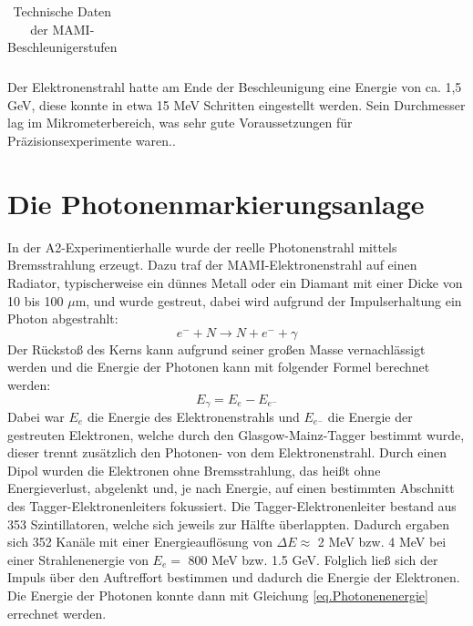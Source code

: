 \documentclass[a4paper,11pt,oneside,final,german,openbib,pdftex]{scrbook}
\begin{document}
{\begin{table}[h]
\begin{center}
\begin{tabular}{|l|c|c|c|c|}
	
		\end{tabular}
		\caption{Technische Daten der MAMI-Beschleunigerstufen \cite{Un08}}
		\label{tab.MAMIstufen}
	\end{center}
\end{table}


 Der Elektronenstrahl hatte am Ende der Beschleunigung eine Energie von ca. 1,5 GeV, diese konnte in etwa 15 MeV Schritten eingestellt werden. Sein Durchmesser lag im Mikrometerbereich, was sehr gute Voraussetzungen f\"ur Pr\"azisionsexperimente waren.\cite{KPh07}. 
 
 
 \section{Die Photonenmarkierungsanlage}
 
 In der A2-Experimentierhalle wurde der reelle Photonenstrahl mittels Bremsstrahlung erzeugt. Dazu traf der MAMI-Elektronenstrahl auf einen Radiator, typischerweise ein d\"unnes Metall oder ein Diamant mit einer Dicke von 10 bis 100 $\mu$m, und wurde gestreut, dabei wird aufgrund der Impulserhaltung ein Photon abgestrahlt:
 \begin{equation}
 e^{-}+N\rightarrow N + e^{-}+\gamma
 \label{eq.Streuung}
 \end{equation}
  Der R\"ucksto{\ss} des Kerns kann aufgrund seiner gro{\ss}en Masse vernachl\"assigt werden und die Energie der Photonen kann mit folgender Formel berechnet werden:
  \begin{equation}
  E_{\gamma}= E_{e^{}}-E_{e^-}
  \label{eq.Photonenenergie}
  \end{equation}
 Dabei war $E_e$ die Energie des Elektronenstrahls und $E_{e^-}$ die Energie der gestreuten Elektronen, welche durch den Glasgow-Mainz-Tagger bestimmt wurde, dieser trennt zus\"atzlich den Photonen- von dem Elektronenstrahl. Durch einen Dipol wurden die Elektronen ohne Bremsstrahlung, das hei{\ss}t ohne Energieverlust, abgelenkt und, je nach Energie, auf einen bestimmten Abschnitt des Tagger-Elektronenleiters fokussiert. Die Tagger-Elektronenleiter bestand aus 353 Szintillatoren, welche sich jeweils zur H\"alfte \"uberlappten. Dadurch ergaben sich 352 Kan\"ale mit einer Energieaufl\"osung von $\Delta E \approx$  2 MeV bzw. 4 MeV bei einer Strahlenenergie von $E_e=$ 800 MeV bzw. 1.5 GeV. Folglich lie{\ss} sich der Impuls \"uber den Auftreffort bestimmen und dadurch die Energie der Elektronen. Die Energie der Photonen konnte dann mit Gleichung \ref{eq.Photonenenergie} errechnet werden.
\newline 
}
\end{document}
